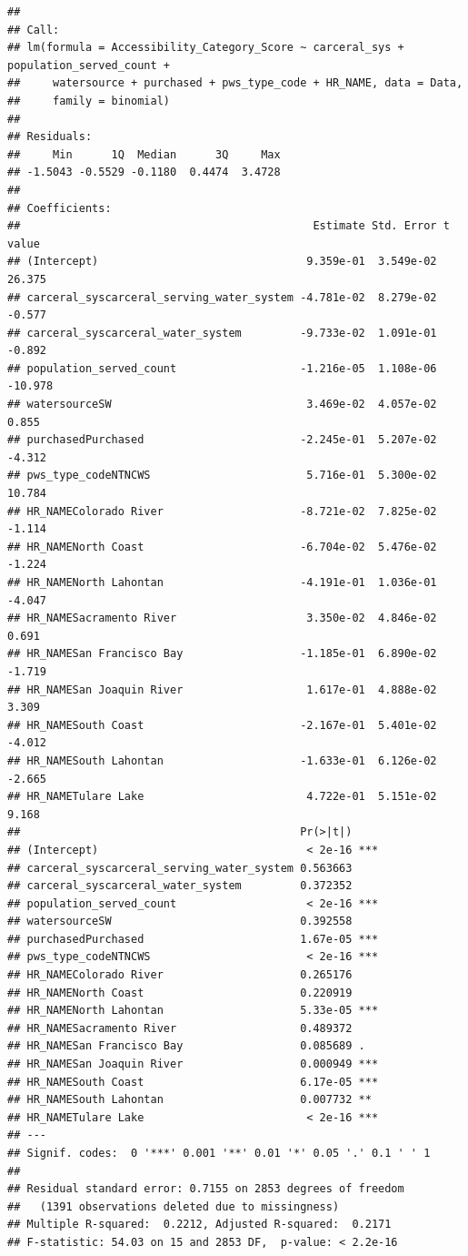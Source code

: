 \documentclass[
]{article}
\begin{document}
\begin{verbatim}
## 
## Call:
## lm(formula = Accessibility_Category_Score ~ carceral_sys + population_served_count + 
##     watersource + purchased + pws_type_code + HR_NAME, data = Data, 
##     family = binomial)
## 
## Residuals:
##     Min      1Q  Median      3Q     Max 
## -1.5043 -0.5529 -0.1180  0.4474  3.4728 
## 
## Coefficients:
##                                             Estimate Std. Error t value
## (Intercept)                                9.359e-01  3.549e-02  26.375
## carceral_syscarceral_serving_water_system -4.781e-02  8.279e-02  -0.577
## carceral_syscarceral_water_system         -9.733e-02  1.091e-01  -0.892
## population_served_count                   -1.216e-05  1.108e-06 -10.978
## watersourceSW                              3.469e-02  4.057e-02   0.855
## purchasedPurchased                        -2.245e-01  5.207e-02  -4.312
## pws_type_codeNTNCWS                        5.716e-01  5.300e-02  10.784
## HR_NAMEColorado River                     -8.721e-02  7.825e-02  -1.114
## HR_NAMENorth Coast                        -6.704e-02  5.476e-02  -1.224
## HR_NAMENorth Lahontan                     -4.191e-01  1.036e-01  -4.047
## HR_NAMESacramento River                    3.350e-02  4.846e-02   0.691
## HR_NAMESan Francisco Bay                  -1.185e-01  6.890e-02  -1.719
## HR_NAMESan Joaquin River                   1.617e-01  4.888e-02   3.309
## HR_NAMESouth Coast                        -2.167e-01  5.401e-02  -4.012
## HR_NAMESouth Lahontan                     -1.633e-01  6.126e-02  -2.665
## HR_NAMETulare Lake                         4.722e-01  5.151e-02   9.168
##                                           Pr(>|t|)    
## (Intercept)                                < 2e-16 ***
## carceral_syscarceral_serving_water_system 0.563663    
## carceral_syscarceral_water_system         0.372352    
## population_served_count                    < 2e-16 ***
## watersourceSW                             0.392558    
## purchasedPurchased                        1.67e-05 ***
## pws_type_codeNTNCWS                        < 2e-16 ***
## HR_NAMEColorado River                     0.265176    
## HR_NAMENorth Coast                        0.220919    
## HR_NAMENorth Lahontan                     5.33e-05 ***
## HR_NAMESacramento River                   0.489372    
## HR_NAMESan Francisco Bay                  0.085689 .  
## HR_NAMESan Joaquin River                  0.000949 ***
## HR_NAMESouth Coast                        6.17e-05 ***
## HR_NAMESouth Lahontan                     0.007732 ** 
## HR_NAMETulare Lake                         < 2e-16 ***
## ---
## Signif. codes:  0 '***' 0.001 '**' 0.01 '*' 0.05 '.' 0.1 ' ' 1
## 
## Residual standard error: 0.7155 on 2853 degrees of freedom
##   (1391 observations deleted due to missingness)
## Multiple R-squared:  0.2212, Adjusted R-squared:  0.2171 
## F-statistic: 54.03 on 15 and 2853 DF,  p-value: < 2.2e-16
\end{verbatim}
\end{document}
